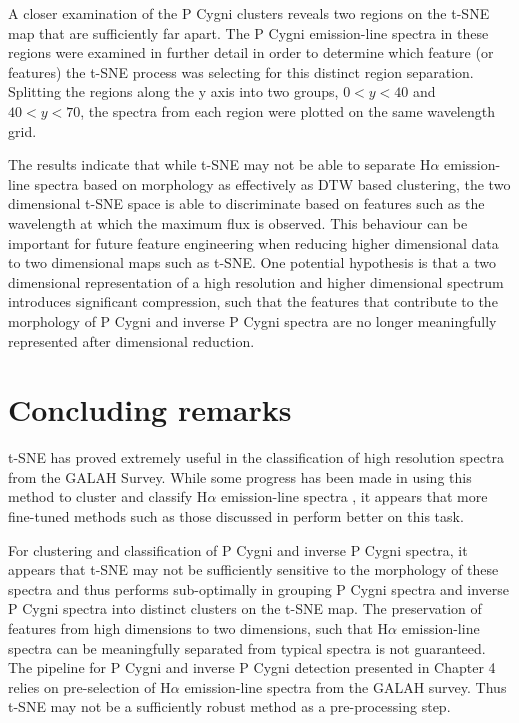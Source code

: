A closer examination of the P Cygni clusters reveals two regions on the t-SNE map that are sufficiently far apart. The P Cygni emission-line spectra in these regions were examined in further detail in order to determine which feature (or features) the t-SNE process was selecting for this distinct region separation. Splitting the regions along the y axis into two groups, $0<y<40$ and $40<y<70$, the spectra from each region were plotted on the same wavelength grid. 

The results indicate that while t-SNE may not be able to separate H$\alpha$ emission-line spectra based on morphology as effectively as DTW based clustering, the two dimensional t-SNE space is able to discriminate based on features such as the wavelength at which the maximum flux is observed. This behaviour can be important for future feature engineering when reducing higher dimensional data to two dimensional maps such as t-SNE. One potential hypothesis  is that a two dimensional representation of a high resolution and higher dimensional spectrum introduces significant compression, such that the features that contribute to the morphology of P Cygni and inverse P Cygni spectra are no longer meaningfully represented after dimensional reduction.

\section{Concluding remarks}

t-SNE has proved extremely useful in the classification of high resolution spectra from the GALAH Survey. While some progress has been made in using this method to cluster and classify H$\alpha$ emission-line spectra \citep{traven2017galah}, it appears that more fine-tuned methods such as those discussed in \citet{vcotar2021galah} perform better on this task.

For clustering and classification of P Cygni and inverse P Cygni spectra, it appears that t-SNE may not be sufficiently sensitive to the morphology of these spectra and thus performs sub-optimally in grouping P Cygni spectra and inverse P Cygni spectra into distinct clusters on the t-SNE map. The preservation of features from high dimensions to two dimensions, such that H$\alpha$ emission-line spectra can be meaningfully separated from typical spectra is not guaranteed. The pipeline for P Cygni and inverse P Cygni detection presented in Chapter 4 relies on pre-selection of H$\alpha$ emission-line spectra from the GALAH survey. Thus t-SNE may not be a sufficiently robust method as a pre-processing step. 

